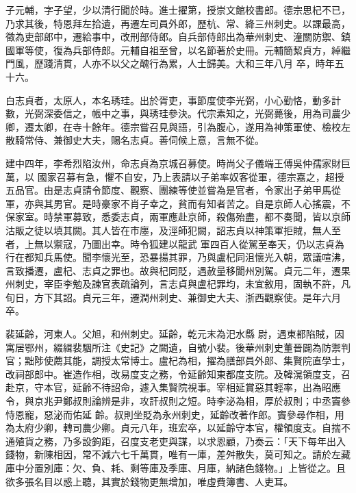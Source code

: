 \begin{pinyinscope}
 子元輔，字子望，少以清行聞於時。進士擢第，授崇文館校書郎。德宗思杞不已，乃求其後，特恩拜左拾遺，再遷左司員外郎，歷杭、常、絳三州刺史。以課最高，徵為吏部郎中，遷給事中，改刑部侍郎。自兵部侍郎出為華州刺史、潼關防禦、鎮國軍等使，復為兵部侍郎。元輔自祖至曾，以名節著於史冊。元輔簡絜貞方，綽繼門風，歷踐清貫，人亦不以父之醜行為累，人士歸美。大和三年八月
 卒，時年五十六。



 白志貞者，太原人，本名琇珪。出於胥吏，事節度使李光弼，小心勤恪，動多計數，光弼深委信之，帳中之事，與琇珪參決。代宗素知之，光弼薨後，用為司農少卿，遷太卿，在寺十餘年。德宗嘗召見與語，引為腹心，遂用為神策軍使、檢校左散騎常侍、兼御史大夫，賜名志貞。善伺候上意，言無不從。



 建中四年，李希烈陷汝州，命志貞為京城召募使。時尚父子儀端王傅吳仲孺家財巨萬，以
 國家召募有急，懼不自安，乃上表請以子弟率奴客從軍，德宗嘉之，超授五品官。由是志貞請令節度、觀察、團練等使並嘗為是官者，令家出子弟甲馬從軍，亦與其男官。是時豪家不肖子幸之，貧而有知者苦之。自是京師人心搖震，不保家室。時禁軍募致，悉委志貞，兩軍應赴京師，殺傷殆盡，都不奏聞，皆以京師沽販之徒以填其闕。其人皆在市廛，及涇師犯闕，詔志貞以神策軍拒賊，無人至者，上無以禦寇，乃圖出幸。時令狐建以龍武
 軍四百人從駕至奉天，仍以志貞為行在都知兵馬使。聞李懷光至，恐暴揚其罪，乃與盧杞同沮懷光入朝，眾議喧沸，言致播遷，盧杞、志貞之罪也。故與杞同貶，遇赦量移閬州別駕。貞元二年，遷果州刺史，宰臣李勉及諫官表疏論列，言志貞與盧杞罪均，未宜敘用，固執不許，凡旬日，方下其詔。貞元三年，遷潤州刺史、兼御史大夫、浙西觀察使。是年六月卒。



 裴延齡，河東人。父旭，和州刺史。延齡，乾元末為汜水縣
 尉，遇東都陷賊，因寓居鄂州，綴緝裴駰所注《史記》之闕遺，自號小裴。後華州刺史董晉闢為防禦判官；黜陟使薦其能，調授太常博士。盧杞為相，擢為膳部員外郎、集賢院直學士，改祠部郎中。崔造作相，改易度支之務，令延齡知東都度支院。及韓滉領度支，召赴京，守本官，延齡不待詔命，遽入集賢院視事。宰相延賞惡其輕率，出為昭應令，與京兆尹鄭叔則論辨是非，攻訐叔則之短。時李泌為相，厚於叔則；中丞竇參恃恩寵，惡泌而佑延
 齡。叔則坐貶為永州刺史，延齡改著作郎。竇參尋作相，用為太府少卿，轉司農少卿。貞元八年，班宏卒，以延齡守本官，權領度支。自揣不通殖貨之務，乃多設鉤距，召度支老吏與謀，以求恩顧，乃奏云：「天下每年出入錢物，新陳相因，常不減六七千萬貫，唯有一庫，差舛散失，莫可知之。請於左藏庫中分置別庫：欠、負、耗、剩等庫及季庫、月庫，納諸色錢物。」上皆從之。且欲多張名目以惑上聽，其實於錢物更無增加，唯虛費簿書、人吏耳。




\end{pinyinscope}
